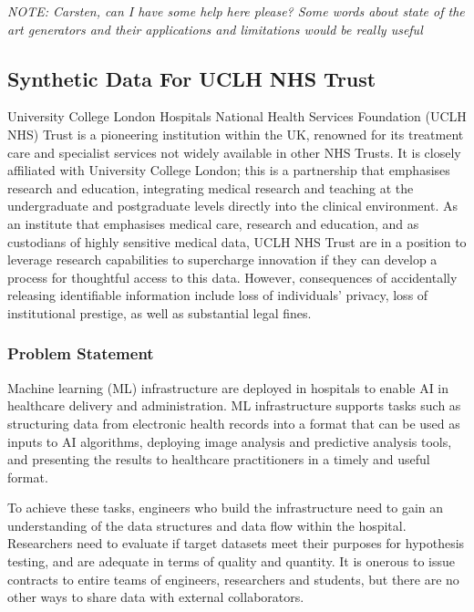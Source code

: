 \documentclass[11pt]{article}
\begin{document}
\textit{NOTE: Carsten, can I have some help here please? Some words about state of the art generators and their applications and limitations would be really useful}

\subsection{Synthetic Data For UCLH NHS Trust}

University College London Hospitals National Health Services Foundation (UCLH NHS) Trust  is a pioneering institution within the UK, renowned for its treatment care and specialist services not widely available in other NHS Trusts. It is closely affiliated with University College London; this is a partnership that emphasises research and education, integrating medical research and teaching at the undergraduate and postgraduate levels directly into the clinical environment. 
As an institute that emphasises medical care, research and education, and as custodians of highly sensitive medical data, UCLH NHS Trust are in a position to leverage research capabilities to supercharge innovation if they can develop a process for thoughtful access to this data. 
However, consequences of accidentally releasing identifiable information include loss of individuals' privacy, loss of institutional prestige, as well as substantial legal fines.

\subsubsection{Problem Statement}

Machine learning (ML) infrastructure are deployed in hospitals to enable AI in healthcare delivery and administration. ML infrastructure supports tasks such as structuring data from electronic health records into a format that can be used as inputs to AI algorithms, deploying image analysis and predictive analysis tools, and presenting the results to healthcare practitioners in a timely and useful format.

To achieve these tasks, engineers who build the infrastructure need to gain an understanding of the data structures and data flow within the hospital. Researchers need to evaluate if target datasets meet their purposes for hypothesis testing, and are adequate in terms of quality and quantity. It is onerous to issue contracts to entire teams of engineers, researchers and students, but there are no other ways to share data with external collaborators. 
\end{document}
